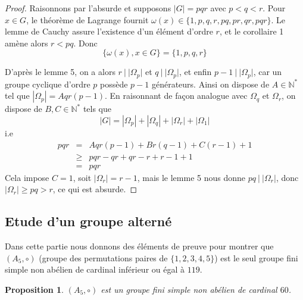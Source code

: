 \documentclass[10pt,a4paper]{article}
\newtheorem{prop}{Proposition}
\begin{document}
\begin{proof}
    Raisonnons par l'absurde et supposons $|G|=pqr$ avec $p < q < r$. Pour $x \in G$, le théorème de Lagrange fournit $\omega(x) \in \{1,p,q,r,pq,pr,qr,pqr\}$. Le lemme de Cauchy assure l'existence d'un élément d'ordre $r$, et le corollaire 1 amène alors $r<pq$. Donc
    $$\{\omega(x), x \in G\} = \{1,p,q,r\}$$

    D'après le lemme 5, on a alors $r \: | \: |\Omega_p|$ et $q \: | \: |\Omega_p|$, et enfin $p-1 \: | \: |\Omega_p|$, car un groupe cyclique d'ordre $p$ possède $p-1$ générateurs. Ainsi on dispose de $A \in \mathbb{N}^*$ tel que $|\Omega_p| = Aqr(p-1)$. En raisonnant de façon analogue avec $\Omega_q$ et $\Omega_r$, on dispose de $B,C \in \mathbb{N}^*$ tels que
    $$|G| = |\Omega_p| + |\Omega_q| + |\Omega_r| + |\Omega_1|$$
    i.e
    \begin{eqnarray*}
        pqr &=& Aqr(p-1) + Br(q-1) + C(r-1) + 1 \\
        &\geq & pqr - qr + qr - r + r - 1 + 1 \\
        &=& pqr
    \end{eqnarray*}
    Cela impose $C = 1$, soit $|\Omega_r|= r-1 $, mais le lemme 5 nous donne $ pq \: | \: |\Omega_r| $, donc $|\Omega_r| \geq pq > r$, ce qui est absurde.


\end{proof}

\subsection{Etude d'un groupe alterné}
Dans cette partie nous donnons des éléments de preuve pour montrer que $(A_5,\circ)$ (groupe des permutations paires de $\{1,2,3,4,5\}$) est le seul groupe fini simple non abélien de cardinal inférieur ou égal à $119$.

\begin{prop}
    $(A_5,\circ)$ est un groupe fini simple non abélien de cardinal $60$.
\end{prop}
\end{document}
